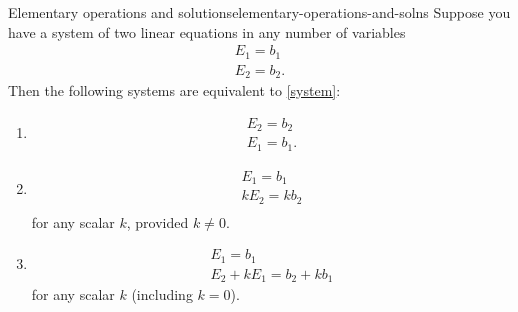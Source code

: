 \begin{theorem}{Elementary operations and solutions}{elementary-operations-and-solns}
Suppose you have a system of two linear equations in any number of variables
\begin{equation}
 \begin{array}{c}
  E_{1}=b_{1}\\
  E_{2}=b_{2}.
\end{array} \label{system}
\end{equation}
Then the following systems are equivalent to \eqref{system}: 
\begin{enumerate}
\item   \begin{equation}
	\begin{array}{c}
	E_{2}=b_{2}\\
	E_{1}=b_{1}.
	\end{array}
	\label{thm-1.9.1}
	\end{equation}
\item  \begin{equation}
	\begin{array}{c}
	E_{1}=b_{1} \\
	kE_{2}=kb_{2}\\        
	\end{array}
	\label{thm-1.9.2}
	\end{equation}
  for any scalar $k$, provided $k\neq0$.
\item \begin{equation}
      \begin{array}{c}
       E_{1}=b_{1} \\
       E_{2}+kE_{1}=b_{2}+kb_{1}
       \end{array}  
	\label{thm-1.9.3}
	\end{equation}
	for any scalar $k$ (including $k=0$).

\end{enumerate}
\end{theorem}

